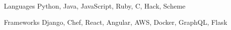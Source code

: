 
\begin{cvskills}
  \cvskill
    {Languages} %
    {Python, Java, JavaScript, Ruby, C, Hack, Scheme} %

  \cvskill
    {Frameworks} %
    {Django, Chef, React, Angular, AWS, Docker, GraphQL, Flask} %
\end{cvskills}

